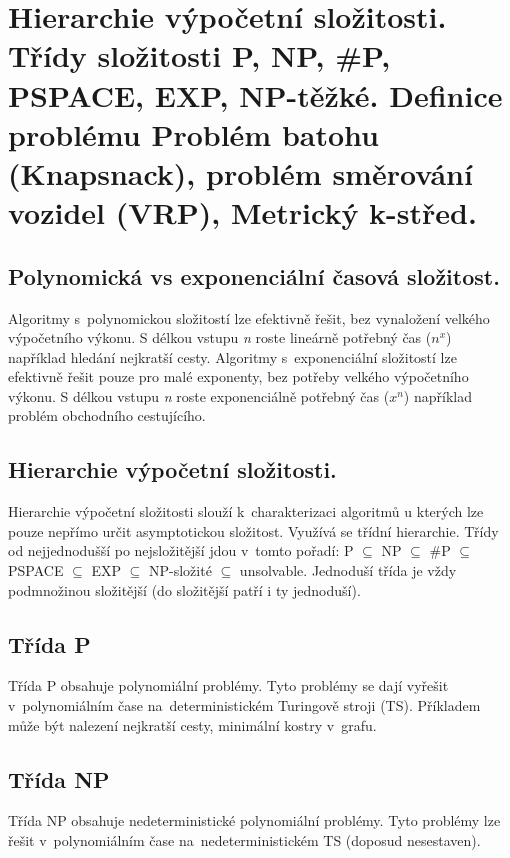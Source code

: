 \section{Hierarchie výpočetní složitosti. Třídy složitosti P, NP, \#P, PSPACE, EXP, NP-těžké. Definice problému Problém batohu (Knapsnack), problém směrování vozidel (VRP), Metrický k-střed.}

\subsection{Polynomická vs exponenciální časová složitost.}

Algoritmy s~polynomickou složitostí lze efektivně řešit, bez vynaložení velkého výpočetního výkonu. 
S délkou vstupu \textit{n} roste lineárně potřebný čas ($n^x$) například hledání nejkratší cesty. 
Algoritmy s~exponenciální složitostí lze efektivně řešit pouze pro malé exponenty, bez potřeby velkého výpočetního výkonu. 
S délkou vstupu \textit{n} roste exponenciálně potřebný čas ($x^n$) například problém obchodního cestujícího.

\subsection{Hierarchie výpočetní složitosti.}

Hierarchie výpočetní složitosti slouží k~charakterizaci algoritmů u kterých lze pouze nepřímo určit asymptotickou složitost. 
Využívá se třídní hierarchie. 
Třídy od nejjednodušší po nejsložitější jdou v~tomto pořadí: P $\subseteq$ NP $\subseteq$ \#P $\subseteq$ PSPACE $\subseteq$ EXP $\subseteq$ NP-složité $\subseteq$ unsolvable. 
Jednoduší třída je vždy podmnožinou složitější (do složitější patří i ty jednoduší).

\subsection{Třída P}

Třída P obsahuje polynomiální problémy. 
Tyto problémy se dají vyřešit v~polynomiálním čase na~deterministickém Turingově stroji (TS). 
Příkladem může být nalezení nejkratší cesty, minimální kostry v~grafu.

\subsection{Třída NP}

Třída NP obsahuje nedeterministické polynomiální problémy. 
Tyto problémy lze řešit v~polynomiálním čase na~nedeterministickém TS (doposud nesestaven).

